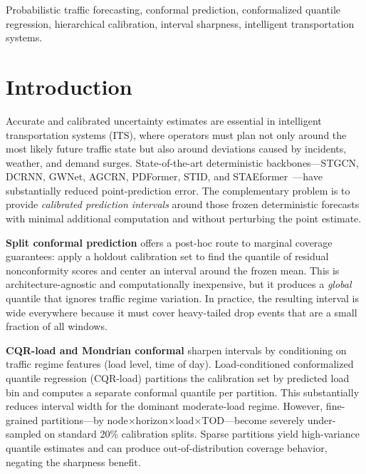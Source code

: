 \documentclass[letterpaper,journal]{IEEEtran}
\begin{document}
\begin{IEEEkeywords}
Probabilistic traffic forecasting, conformal prediction, conformalized quantile regression, hierarchical calibration, interval sharpness, intelligent transportation systems.
\end{IEEEkeywords}

\section{Introduction}

Accurate and calibrated uncertainty estimates are essential in intelligent
transportation systems (ITS), where operators must plan not only around the
most likely future traffic state but also around deviations caused by
incidents, weather, and demand surges.  State-of-the-art deterministic
backbones---STGCN, DCRNN, GWNet, AGCRN, PDFormer, STID, and
STAEformer~\cite{yu2018stgcn,li2018dcrnn,wu2019graphwavenet,bai2020agcrn,jiang2023pdformer,shao2022stid,liu2023staeformer}---have
substantially reduced point-prediction error.  The complementary problem is
to provide \emph{calibrated prediction intervals} around those frozen
deterministic forecasts with minimal additional computation and without
perturbing the point estimate.

\textbf{Split conformal prediction} offers a post-hoc route to marginal
coverage guarantees: apply a holdout calibration set to find the quantile of
residual nonconformity scores and center an interval around the frozen mean.
This is architecture-agnostic and computationally inexpensive, but it
produces a \emph{global} quantile that ignores traffic regime variation.  In
practice, the resulting interval is wide everywhere because it must cover
heavy-tailed drop events that are a small fraction of all windows.

\textbf{CQR-load and Mondrian conformal} sharpen intervals by conditioning
on traffic regime features (load level, time of day).  Load-conditioned
conformalized quantile regression (CQR-load) partitions the calibration set
by predicted load bin and computes a separate conformal quantile per
partition.  This substantially reduces interval width for the dominant
moderate-load regime.  However, fine-grained partitions---by
node$\times$horizon$\times$load$\times$TOD---become severely under-sampled
on standard 20\% calibration splits.  Sparse partitions yield high-variance
quantile estimates and can produce out-of-distribution coverage behavior,
negating the sharpness benefit.
\end{document}
